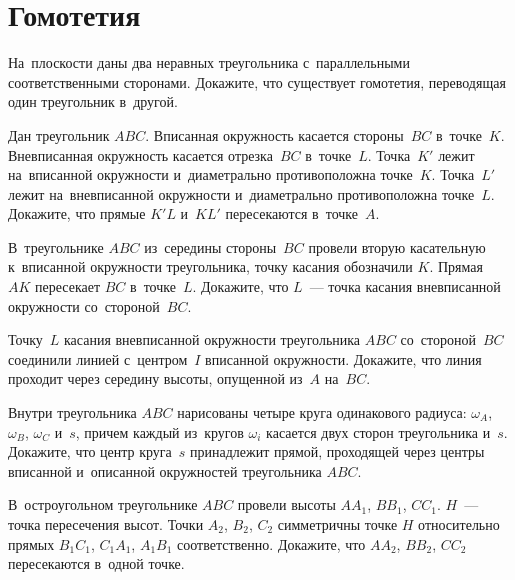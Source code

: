 
\section*{Гомотетия}


\begin{problems}

\item
На~плоскости даны два неравных треугольника с~параллельными соответственными
сторонами.
Докажите, что существует гомотетия, переводящая один треугольник в~другой.

\item
Дан треугольник $ABC$.
Вписанная окружность касается стороны~$BC$ в~точке~$K$.
Вневписанная окружность касается отрезка~$BC$ в~точке~$L$.
Точка~$K'$ лежит на~вписанной окружности и~диаметрально противоположна
точке~$K$.
Точка~$L'$ лежит на~вневписанной окружности и~диаметрально противоположна
точке~$L$.
Докажите, что прямые $K'L$ и~$KL'$ пересекаются в~точке~$A$.

\item
В~треугольнике $ABC$ из~середины стороны~$BC$ провели вторую касательную
к~вписанной окружности треугольника, точку касания обозначили $K$.
Прямая~$AK$ пересекает $BC$ в~точке~$L$.
Докажите, что $L$~— точка касания вневписанной окружности со~стороной~$BC$.

\item
Точку~$L$ касания вневписанной окружности треугольника $ABC$ со~стороной~$BC$
соединили линией с~центром~$I$ вписанной окружности.
Докажите, что линия проходит через середину высоты, опущенной из~$A$ на~$BC$.

\item
Внутри треугольника $ABC$ нарисованы четыре круга одинакового радиуса:
$\omega_A$, $\omega_B$, $\omega_C$ и~$s$, причем каждый из~кругов $\omega_i$
касается двух сторон треугольника и~$s$.
Докажите, что центр круга~$s$ принадлежит прямой, проходящей через центры
вписанной и~описанной окружностей треугольника $ABC$.

\item
В~остроугольном треугольнике $ABC$ провели высоты $A A_1$, $B B_1$, $C C_1$.
$H$~— точка пересечения высот.
Точки $A_2$, $B_2$, $C_2$ симметричны точке $H$ относительно прямых
$B_1 C_1$, $C_1 A_1$, $A_1 B_1$ соответственно.
Докажите, что $A A_2$, $B B_2$, $C C_2$ пересекаются в~одной точке.


\end{problems}
